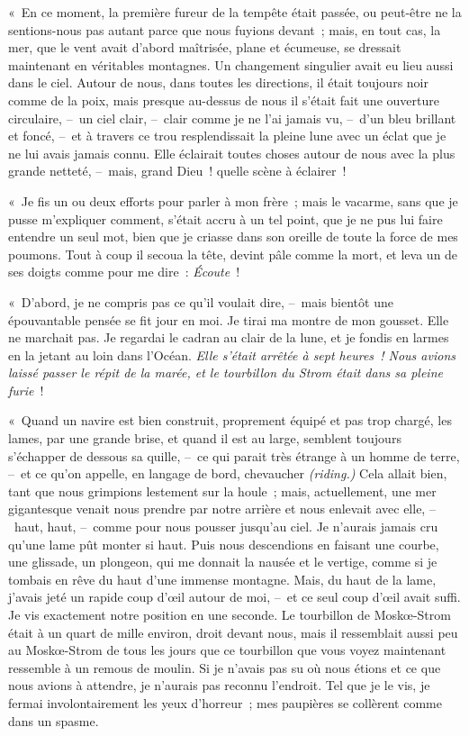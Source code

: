 \documentclass[french,twoside]{book} %
\begin{document}
« En ce moment, la première fureur de la tempête était passée, ou peut-être ne la sentions-nous pas autant parce que nous fuyions devant ; mais, en tout cas, la mer, que le vent avait d’abord maîtrisée, plane et écumeuse, se dressait maintenant en véritables montagnes. Un changement singulier avait eu lieu aussi dans le ciel. Autour de nous, dans toutes les directions, il était toujours noir comme de la poix, mais presque au-dessus de nous il s’était fait une ouverture circulaire, – un ciel clair, – clair comme je ne l’ai jamais vu, – d’un bleu brillant et foncé, – et à travers ce trou resplendissait la pleine lune avec un éclat que je ne lui avais jamais connu. Elle éclairait toutes choses autour de nous avec la plus grande netteté, – mais, grand Dieu ! quelle scène à éclairer !\par
« Je fis un ou deux efforts pour parler à mon frère ; mais le vacarme, sans que je pusse m’expliquer comment, s’était accru à un tel point, que je ne pus lui faire entendre un seul mot, bien que je criasse dans son oreille de toute la force de mes poumons. Tout à coup il secoua la tête, devint pâle comme la mort, et leva un de ses doigts comme pour me dire : \emph{Écoute} !\par
« D’abord, je ne compris pas ce qu’il voulait dire, – mais bientôt une épouvantable pensée se fit jour en moi. Je tirai ma montre de mon gousset. Elle ne marchait pas. Je regardai le cadran au clair de la lune, et je fondis en larmes en la jetant au loin dans l’Océan. \emph{Elle s’était arrêtée à sept heures ! Nous avions laissé passer le répit de la marée, et le tourbillon du Strom était dans sa pleine furie} !\par
« Quand un navire est bien construit, proprement équipé et pas trop chargé, les lames, par une grande brise, et quand il est au large, semblent toujours s’échapper de dessous sa quille, – ce qui parait très étrange à un homme de terre, – et ce qu’on appelle, en langage de bord, chevaucher \emph{(riding.)} Cela allait bien, tant que nous grimpions lestement sur la houle ; mais, actuellement, une mer gigantesque venait nous prendre par notre arrière et nous enlevait avec elle, – haut, haut, – comme pour nous pousser jusqu’au ciel. Je n’aurais jamais cru qu’une lame pût monter si haut. Puis nous descendions en faisant une courbe, une glissade, un plongeon, qui me donnait la nausée et le vertige, comme si je tombais en rêve du haut d’une immense montagne. Mais, du haut de la lame, j’avais jeté un rapide coup d’œil autour de moi, – et ce seul coup d’œil avait suffi. Je vis exactement notre position en une seconde. Le tourbillon de Moskœ-Strom était à un quart de mille environ, droit devant nous, mais il ressemblait aussi peu au Moskœ-Strom de tous les jours que ce tourbillon que vous voyez maintenant ressemble à un remous de moulin. Si je n’avais pas su où nous étions et ce que nous avions à attendre, je n’aurais pas reconnu l’endroit. Tel que je le vis, je fermai involontairement les yeux d’horreur ; mes paupières se collèrent comme dans un spasme.\par
\end{document}
